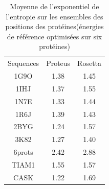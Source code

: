     \clearpage

    \begin{table}[!htbp]
      \centering

      \begin{tabular}{ccc}

        \toprule
        Sequences & Proteus & Rosetta \\
        \cmidrule{1-3}
        1G9O  & 1.38  & 1.45 \\
        1IHJ  & 1.37  & 1.55 \\
        1N7E  & 1.33  & 1.44 \\
        1R6J  & 1.39  & 1.43 \\
        2BYG  & 1.24  & 1.57 \\
        3K82  & 1.27  & 1.40 \\
        6prots & 2.42  & 2.88 \\
        TIAM1  & 1.55  & 1.57 \\
        CASK   & 1.22  & 1.69 \\
        \bottomrule

      \end{tabular}      
      \caption{Moyenne de l'exponentiel de l'entropie sur les ensembles des positions des protéines(énergies de référence optimisées sur six protéines)}
\label{tab:Entropie_PDZ}      
    \end{table}



